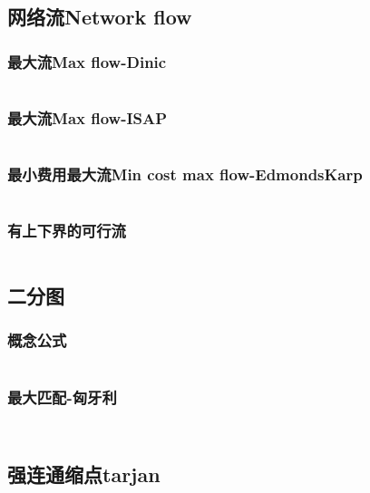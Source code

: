 \documentclass[twoside,sub3section,UTF8]{ctexart}						%
\begin{document}
	\subsection{网络流Network flow}
		\subsubsection{最大流Max flow-Dinic}
		\inputminted{c++}{"Gragh Theory/Network Flow/dinic.cpp"}
		\subsubsection{最大流Max flow-ISAP}
		\inputminted{c++}{"Gragh Theory/Network Flow/ISAP.cpp"}
		\subsubsection{最小费用最大流Min cost max flow-EdmondsKarp}
		\inputminted{c++}{"Gragh Theory/Network Flow/MCMF.cpp"}
		\subsubsection{有上下界的可行流}
		\inputminted{c++}{"Gragh Theory/Network Flow/lowup.cpp"}

	\subsection{二分图}
		\subsubsection{概念公式}
		\inputminted{c++}{"Gragh Theory/Bipartite gragh/emmm.cpp"}
		\subsubsection{最大匹配-匈牙利}
		\inputminted{c++}{"Gragh Theory/Bipartite gragh/hungary.cpp"}
		\inputminted{c++}{"Gragh Theory/Bipartite gragh/hungarymatrix.cpp"}

	\subsection{强连通缩点tarjan}
	\inputminted{c++}{"Gragh Theory/SCC.cpp"}
\end{document}
